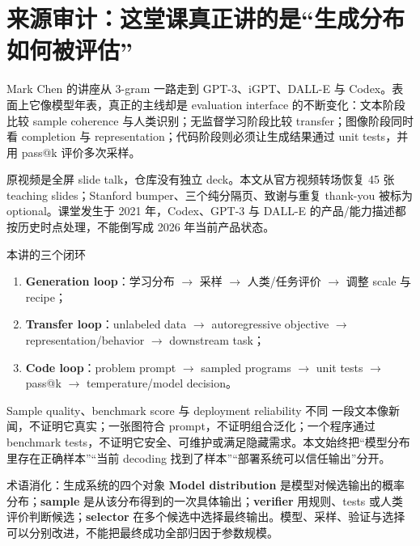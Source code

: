 \documentclass[a4paper]{article}
\begin{document}
\makecscover

\section{来源审计：这堂课真正讲的是“生成分布如何被评估”}

Mark Chen 的讲座从 3-gram 一路走到 GPT-3、iGPT、DALL-E 与 Codex。表面上它像模型年表，真正的主线却是 evaluation interface 的不断变化：文本阶段比较 sample coherence 与人类识别；无监督学习阶段比较 transfer；图像阶段同时看 completion 与 representation；代码阶段则必须让生成结果通过 unit tests，并用 pass@k 评价多次采样。

原视频是全屏 slide talk，仓库没有独立 deck。本文从官方视频转场恢复 45 张 teaching slides；Stanford bumper、三个纯分隔页、致谢与重复 thank-you 被标为 optional。课堂发生于 2021 年，Codex、GPT-3 与 DALL-E 的产品/能力描述都按历史时点处理，不能倒写成 2026 年当前产品状态。

\begin{importantbox}{本讲的三个闭环}
\begin{enumerate}
  \item \textbf{Generation loop}：学习分布 $\rightarrow$ 采样 $\rightarrow$ 人类/任务评价 $\rightarrow$ 调整 scale 与 recipe；
  \item \textbf{Transfer loop}：unlabeled data $\rightarrow$ autoregressive objective $\rightarrow$ representation/behavior $\rightarrow$ downstream task；
  \item \textbf{Code loop}：problem prompt $\rightarrow$ sampled programs $\rightarrow$ unit tests $\rightarrow$ pass@k $\rightarrow$ temperature/model decision。
\end{enumerate}
\end{importantbox}

\begin{warningbox}{Sample quality、benchmark score 与 deployment reliability 不同}
一段文本像新闻，不证明它真实；一张图符合 prompt，不证明组合泛化；一个程序通过 benchmark tests，不证明它安全、可维护或满足隐藏需求。本文始终把“模型分布里存在正确样本”“当前 decoding 找到了样本”“部署系统可以信任输出”分开。
\end{warningbox}

\begin{knowledgebox}{术语消化：生成系统的四个对象}
\textbf{Model distribution} 是模型对候选输出的概率分布；\textbf{sample} 是从该分布得到的一次具体输出；\textbf{verifier} 用规则、tests 或人类评价判断候选；\textbf{selector} 在多个候选中选择最终输出。模型、采样、验证与选择可以分别改进，不能把最终成功全部归因于参数规模。
\end{knowledgebox}
\end{document}
